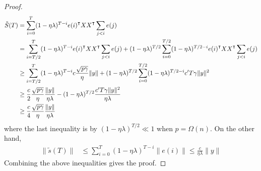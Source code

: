 \begin{proof}
\begin{equation*}
\begin{aligned}
    \tilde{S}(T) &= \sum_{i=0}^T(1-\eta\lambda)^{T-i}e(i)\transpose XX\transpose \sum_{j<i}e(j) \\
    &= \sum_{i=T/2}^T(1-\eta\lambda)^{T-i}e(i)\transpose XX\transpose \sum_{j<i}e(j) + (1-\eta\lambda)^{T/2}\sum_{i=0}^{T/2}(1-\eta\lambda)^{T/2-i}e(i)\transpose XX\transpose \sum_{j<i}e(j) \\
    &\geq \sum_{i=T/2}^T(1-\eta\lambda)^{T-i}c\frac{\sqrt{p\gamma}}{\eta}\|y\| + (1-\eta\lambda)^{T/2}\sum_{i=0}^{T/2}(1-\eta\lambda)^{T/2-i}c'T\gamma\|y\|^2 \\
    &\geq \frac{c}{2}\frac{\sqrt{p\gamma}}{\eta}\frac{\|y\|}{\eta\lambda} -(1-\eta\lambda)^{T/2}\frac{c'T\gamma\|y\|^2}{\eta\lambda} \\
    &\geq \frac{c}{4}\frac{\sqrt{p\gamma}}{\eta}\frac{\|y\|}{\eta\lambda}
\end{aligned}
\end{equation*}
where the last inequality is by $(1-\eta\lambda)^{T/2}\ll 1$ when $p=\Omega(n)$. On the other hand,
\begin{equation*}
\begin{aligned}
\|\tilde{s}(T)\|  
&\leq \sum_{i=0}^T(1-\eta\lambda)^{T-i}\|e(i)\|\leq \frac{c}{\eta\lambda}\|y\|
\end{aligned}
\end{equation*}
Combining the above inequalities gives the proof.
\end{proof}

